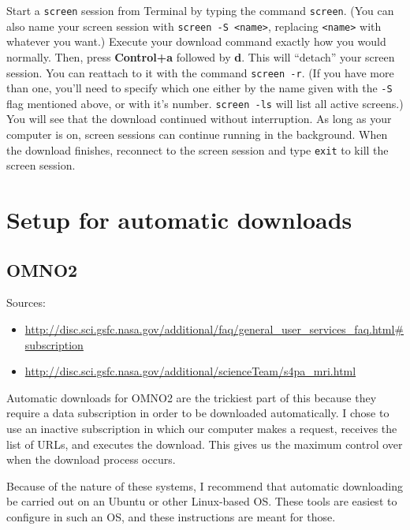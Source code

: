\documentclass[12pt]{article}
\begin{document}
	Start a \lstinline$screen$ session from Terminal by typing the command \lstinline$screen$. (You can also name your screen session with \lstinline$screen -S <name>$, replacing \lstinline$<name>$ with whatever you want.) Execute your download command exactly how you would normally. Then, press \textbf{Control+a} followed by \textbf{d}. This will ``detach'' your screen session. You can reattach to it with the command \lstinline$screen -r$. (If you have more than one, you'll need to specify which one either by the name given with the \lstinline$-S$ flag mentioned above, or with it's number. \lstinline$screen -ls$ will list all active screens.) You will see that the download continued without interruption. As long as your computer is on, screen sessions can continue running in the background. When the download finishes, reconnect to the screen session and type \lstinline$exit$ to kill the screen session.

\section{Setup for automatic downloads} \label{app:autodl}
\subsection{OMNO2}
	Sources:
	\begin{itemize}
	\item \url{http://disc.sci.gsfc.nasa.gov/additional/faq/general_user_services_faq.html#subscription}
	\item \url{http://disc.sci.gsfc.nasa.gov/additional/scienceTeam/s4pa_mri.html}
	\end{itemize}

	Automatic downloads for OMNO2 are the trickiest part of this because they require a data subscription in order to be downloaded automatically. I chose to use an inactive subscription in which our computer makes a request, receives the list of URLs, and executes the download.  This gives us the maximum control over when the download process occurs.
	
	Because of the nature of these systems, I recommend that automatic downloading be carried out on an Ubuntu or other Linux-based OS.  These tools are easiest to configure in such an OS, and these instructions are meant for those.
	
\end{document}
